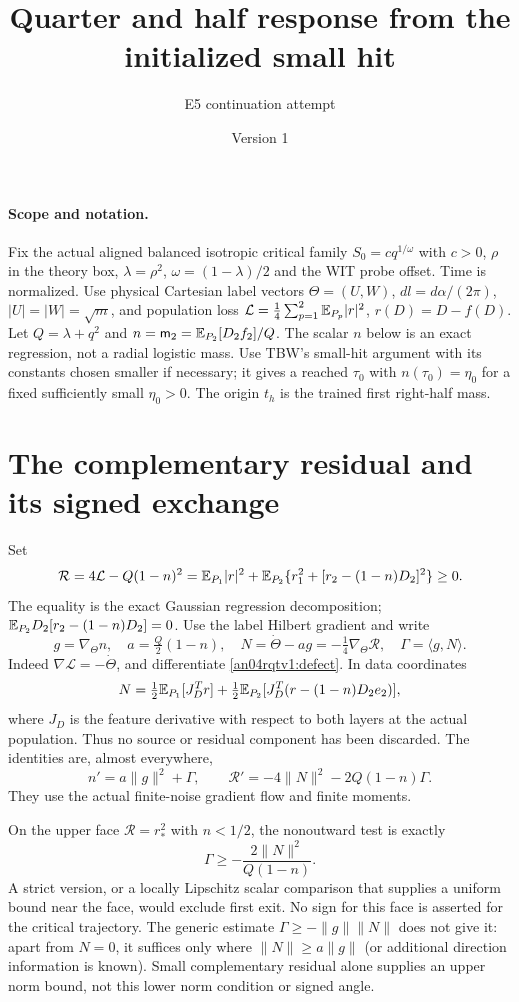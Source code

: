 \documentclass[11pt]{article}
\title{Quarter and half response from the initialized small hit}
\author{E5 continuation attempt}\date{Version 1}
\begin{document}
\maketitle

\paragraph{Scope and notation.}
Fix the actual aligned balanced isotropic critical family
$S_0=cq^{1/\omega}$ with $c>0$, $\rho$ in the theory box,
$\lambda=\rho^2$, $\omega=(1-\lambda)/2$ and the WIT probe offset.
Time is normalized. Use physical Cartesian label vectors
$\Theta=(U,W)$, $dl=d\alpha/(2\pi)$, $|U|=|W|=\sqrt m$,
and population loss
$\mathcal L=\frac14\sum_{p=1}^2\mathbb E_{P_p}|r|^2$, $r(D)=D-f(D)$.
Let $Q=\lambda+q^2$ and $n=\mathsf m_2=\mathbb E_{P_2}[D_2f_2]/Q$.
The scalar $n$ below is an exact regression, not a radial logistic mass.
Use TBW's small-hit argument with its constants chosen smaller if
necessary; it gives a reached $\tau_0$ with $n(\tau_0)=\eta_0$
for a fixed sufficiently small $\eta_0>0$. The origin $t_h$
is the trained first right-half mass.

\section{The complementary residual and its signed exchange}
Set
\begin{equation}\label{an04rqtv1:defect}
 \mathcal R=4\mathcal L-Q(1-n)^2
  =\mathbb E_{P_1}|r|^2+
    \mathbb E_{P_2}\{r_1^2+[r_2-(1-n)D_2]^2\}\ge0.
\end{equation}
The equality is the exact Gaussian regression decomposition;
$\mathbb E_{P_2}D_2[r_2-(1-n)D_2]=0$.
Use the label Hilbert gradient and write
\[
 g=\nabla_\Theta n,\quad
 a=\tfrac Q2(1-n),\quad
 N=\dot\Theta-a g=-\tfrac14\nabla_\Theta\mathcal R,\quad
 \Gamma=\langle g,N\rangle .
\]
Indeed $\nabla\mathcal L=-\dot\Theta$, and differentiate
\eqref{an04rqtv1:defect}. In data coordinates
\[
 N=\tfrac12\mathbb E_{P_1}[J_D^T r]+
   \tfrac12\mathbb E_{P_2}[J_D^T(r-(1-n)D_2e_2)],
\]
where $J_D$ is the feature derivative with respect to both layers
at the actual population. Thus no source or residual component has
been discarded. The identities are, almost everywhere,
\begin{equation}\label{an04rqtv1:exchange}
 n'=a\|g\|^2+\Gamma,\qquad
 \mathcal R'=-4\|N\|^2-2Q(1-n)\Gamma .
\end{equation}
They use the actual finite-noise gradient flow and finite moments.

On the upper face $\mathcal R=r_*^2$ with $n<1/2$, the nonoutward
test is exactly
\begin{equation}\label{an04rqtv1:face}
 \Gamma\ge-\frac{2\|N\|^2}{Q(1-n)} .
\end{equation}
A strict version, or a locally Lipschitz scalar comparison that
supplies a uniform bound near the face, would exclude first exit.
No sign for this face is asserted for the critical trajectory.
The generic estimate $\Gamma\ge-\|g\|\|N\|$ does not give it:
apart from $N=0$, it suffices only where $\|N\|\ge a\|g\|$
(or additional direction information is known). Small complementary residual alone supplies
an upper norm bound, not this lower norm condition or signed angle.
\end{document}
